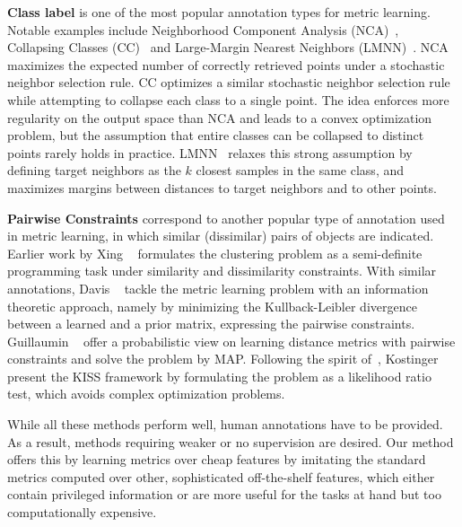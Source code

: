 \documentclass[10pt,twocolumn,letterpaper]{article}
\begin{document}
\textbf{Class label} is one of the most popular annotation types for
metric learning. 
Notable examples include Neighborhood Component Analysis (NCA)~\cite{NCA:2004}, 
Collapsing Classes (CC)~\cite{class:clapse:nips05} and Large-Margin 
Nearest Neighbors (LMNN)~\cite{max:margin:knn}. NCA maximizes the expected 
number of correctly retrieved points under a stochastic neighbor selection
rule. CC optimizes a similar stochastic neighbor selection rule while
attempting to collapse each class to a single point. The idea enforces
more regularity on the output space than NCA and leads to a convex
optimization problem, but the assumption that entire classes can be
collapsed to distinct points rarely holds in practice.
LMNN~\cite{max:margin:knn} relaxes this strong assumption by defining
target neighbors as the $k$ closest samples in the same class, and
maximizes margins between distances to target neighbors and to other
points.

\textbf{Pairwise Constraints} correspond to another popular type of
annotation used in metric learning, in which similar (dissimilar)
pairs of objects are indicated. Earlier work by Xing
\etal~\cite{metric:nips03} formulates the clustering problem as a
semi-definite programming task under similarity and dissimilarity
constraints. With similar annotations, Davis
\etal~\cite{ml:information:07} tackle the metric learning problem with
an information theoretic approach, namely by minimizing the
Kullback-Leibler divergence between a learned and a prior matrix,
expressing the pairwise constraints. Guillaumin
\etal~\cite{ml:face:09} offer a probabilistic view on learning
distance metrics with pairwise constraints and solve the problem by
MAP. Following the spirit of~\cite{ml:information:07, ml:face:09},
Kostinger \etal \cite{large:scale:metric:cvpr12} present the KISS
framework by formulating the problem as a likelihood ratio test, which
avoids complex optimization problems.  

While all these methods perform well, human annotations have to be
provided. As a result, methods requiring weaker or no supervision are
desired. Our method offers this by learning metrics over
cheap features by imitating the standard metrics computed over other, sophisticated 
off-the-shelf features, which either contain privileged information or are more
useful for the tasks at hand but too computationally expensive.
\end{document}
